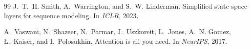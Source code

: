 \documentclass[11pt]{article}
\begin{document}
\begin{thebibliography}{99}
J.~T.~H. Smith, A.~Warrington, and S.~W. Linderman.
\newblock Simplified state space layers for sequence modeling.
\newblock In \emph{ICLR}, 2023.

A.~Vaswani, N.~Shazeer, N.~Parmar, J.~Uszkoreit, L.~Jones, A.~N. Gomez, {\L}.~Kaiser, and I.~Polosukhin.
\newblock Attention is all you need.
\newblock In \emph{NeurIPS}, 2017.

\end{thebibliography}
\end{document}
